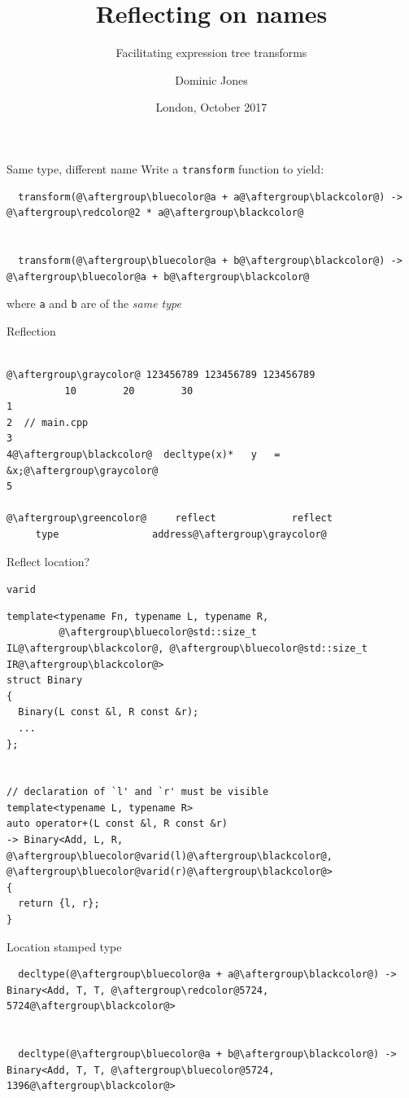 \documentclass[xcolor=dvipsnames]{beamer}
\title{Reflecting on names}
\subtitle{Facilitating expression tree transforms}
\author{Dominic Jones}
\institute{\texttt{dominic.jones@gmx.co.uk}}
\date{London, October 2017}
\begin{document}
\begin{frame}[plain]
  \titlepage
\end{frame}


\begin{frame}[fragile]{Same type, different name}
Write a \texttt{transform} function to yield:\vspace{10mm}
\begin{lstlisting}
  transform(@\aftergroup\bluecolor@a + a@\aftergroup\blackcolor@) -> @\aftergroup\redcolor@2 * a@\aftergroup\blackcolor@


  transform(@\aftergroup\bluecolor@a + b@\aftergroup\blackcolor@) -> @\aftergroup\bluecolor@a + b@\aftergroup\blackcolor@
\end{lstlisting}
\vspace{10mm}where {\color{blue}\texttt{a}} and {\color{blue}\texttt{b}} are of the \emph{same type}
\end{frame}


\begin{frame}[fragile]{Reflection}
  \begin{lstlisting}

@\aftergroup\graycolor@ 123456789 123456789 123456789
          10        20        30
1
2  // main.cpp
3
4@\aftergroup\blackcolor@  decltype(x)*   y   =   &x;@\aftergroup\graycolor@
5

@\aftergroup\greencolor@     reflect             reflect
     type                address@\aftergroup\graycolor@
  \end{lstlisting}
 \vspace{10mm}
Reflect location?
\end{frame}


\begin{frame}[fragile]{\texttt{varid}}
\begin{lstlisting}
template<typename Fn, typename L, typename R,
         @\aftergroup\bluecolor@std::size_t IL@\aftergroup\blackcolor@, @\aftergroup\bluecolor@std::size_t IR@\aftergroup\blackcolor@>
struct Binary
{
  Binary(L const &l, R const &r);
  ...
};


// declaration of `l' and `r' must be visible
template<typename L, typename R>
auto operator+(L const &l, R const &r)
-> Binary<Add, L, R, @\aftergroup\bluecolor@varid(l)@\aftergroup\blackcolor@, @\aftergroup\bluecolor@varid(r)@\aftergroup\blackcolor@>
{
  return {l, r};
}
\end{lstlisting}
\end{frame}


\begin{frame}[fragile]{Location stamped type}
\begin{lstlisting}
  decltype(@\aftergroup\bluecolor@a + a@\aftergroup\blackcolor@) -> Binary<Add, T, T, @\aftergroup\redcolor@5724, 5724@\aftergroup\blackcolor@>


  decltype(@\aftergroup\bluecolor@a + b@\aftergroup\blackcolor@) -> Binary<Add, T, T, @\aftergroup\bluecolor@5724, 1396@\aftergroup\blackcolor@>
\end{lstlisting}
\end{frame}
\end{document}
